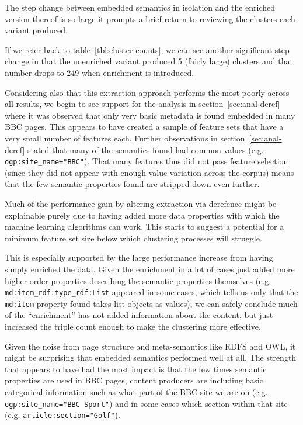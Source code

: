 The step change between embedded semantics in isolation and the
enriched version thereof is so large it prompts a brief return to
reviewing the clusters each variant produced.

If we refer back to table~\ref{tbl:cluster-counts}, we can see
another significant step change in that the unenriched variant
produced 5 (fairly large) clusters and that number drops to 249 when
enrichment is introduced.

Considering also that this extraction approach performs the most
poorly across all results, we begin to see support for the analysis
in section~\ref{sec:anal-deref} where it was observed that only very
basic metadata is found embedded in many BBC pages. This appears to
have created a sample of feature sets that have a very small number
of features each. Further observations in
section~\ref{sec:anal-deref} stated that
many of the semantics found had
common values (e.g. \texttt{ogp:site\_name="BBC"}). That many features
thus did not pass feature selection (since they did not appear
with enough value variation across the corpus) means that the few
semantic properties found are stripped down even further.

Much of the performance gain by altering extraction via derefence
might be explainable purely due to having added more data properties
with which the machine learning algorithms can work. This starts to
suggest a potential for a minimum feature set size below which
clustering processes will struggle.

This is especially supported by
the large performance increase from having simply enriched the data.
Given the enrichment in a lot of cases just added more higher order
properties describing the semantic properties themselves (e.g.
\texttt{md:item\_rdf:type\_rdf:List} appeared in some cases, which
tells us only that the \texttt{md:item} property found takes
list objects as values), we can safely conclude much of the
``enrichment'' has not added information about the content, but
just increased the triple count enough to make the clustering more
effective.

Given the noise from page structure and meta-semantics like RDFS and
OWL, it might be surprising that embedded semantics performed well
at all. The strength that appears to have had the most impact is that
the few times semantic properties are used in BBC pages, content
producers are including basic categorical information such as what
part of the BBC site we are on (e.g. \texttt{ogp:site\_name="BBC Sport"})
and in some cases which section within that site
(e.g. \texttt{article:section="Golf"}).

